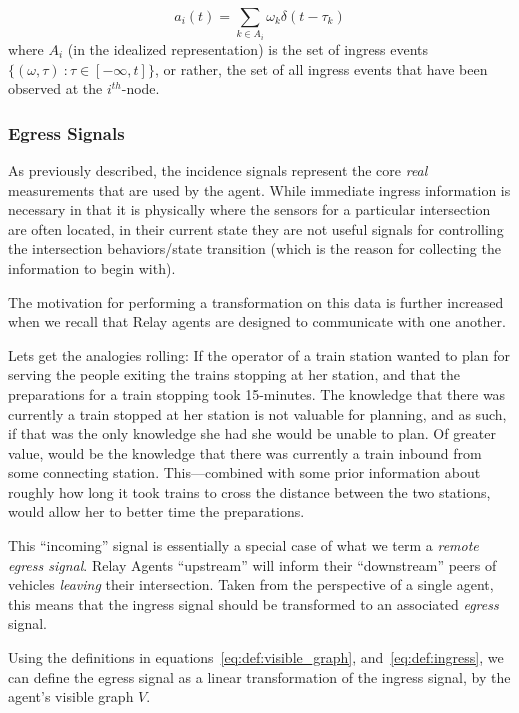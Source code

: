 \documentclass{report}
\begin{document}
\begin{equation}\label{eq:def:ingress}
	a_i(t) = \sum_{k \in A_i} \omega_k \delta(t - \tau_k)
\end{equation}
where $A_i$ (in the idealized representation) is the set of ingress events $\{(\omega, \tau)\ : \tau \in [-\infty, t]\}$, or rather, the set of all ingress events that have been observed at the $i^{th}$-node.


\subsubsection{Egress Signals}
\label{sec:def:egress}

As previously described, the incidence signals represent the core \emph{real} measurements that are used by the agent.
While immediate ingress information is necessary in that it is physically where the sensors for a particular intersection are often located, in their current state they are not useful signals for controlling the intersection behaviors/state transition (which is the reason for collecting the information to begin with).

The motivation for performing a transformation on this data is further increased when we recall that Relay agents are designed to communicate with one another.

Lets get the analogies rolling: If the operator of a train station wanted to plan for serving the people exiting the trains stopping at her station, and that the preparations for a train stopping took 15-minutes.
The knowledge that there was currently a train stopped at her station is not valuable for planning, and as such, if that was the only knowledge she had she would be unable to plan.
Of greater value, would be the knowledge that there was currently a train inbound from some connecting station.
This---combined with some prior information about roughly how long it took trains to cross the distance between the two stations, would allow her to better time the preparations.

This ``incoming'' signal is essentially a special case of what we term a \emph{remote egress signal}.
Relay Agents ``upstream'' will inform their ``downstream'' peers of vehicles \emph{leaving} their intersection.
Taken from the perspective of a single agent, this means that the ingress signal should be transformed to an associated \emph{egress} signal.

Using the definitions in equations~\eqref{eq:def:visible_graph}, and~\eqref{eq:def:ingress}, we can define the egress signal as a linear transformation of the ingress signal, by the agent's visible graph $V$.
\end{document}
